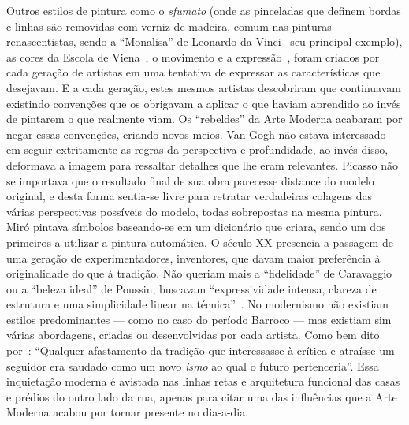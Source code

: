 Outros estilos de pintura como o \textit{sfumato} (onde as pinceladas
que definem bordas e linhas são removidas com verniz de madeira, comum
nas pinturas renascentistas, sendo a ``Monalisa'' de Leonardo da
Vinci~\cite{pegus, hall} seu principal exemplo), as cores da Escola de
Viena~\cite{gardner}, o movimento e a expressão~\cite{gombrich,
  gordon}, foram criados por cada geração de artistas em uma tentativa
de expressar as características que desejavam. E a cada geração, estes
mesmos artistas descobriram que continuavam existindo convenções que
os obrigavam a aplicar o que haviam aprendido ao invés de pintarem o
que realmente viam. Os ``rebeldes'' da Arte Moderna acabaram por negar
essas convenções, criando novos meios. Van Gogh não estava interessado
em seguir extritamente as regras da perspectiva e profundidade, ao
invés disso, deformava a imagem para ressaltar detalhes que lhe eram
relevantes. Picasso não se importava que o resultado final de sua obra
parecesse distance do modelo original, e desta forma sentia-se livre
para retratar verdadeiras colagens das várias perspectivas possíveis
do modelo, todas sobrepostas na mesma pintura. Miró pintava símbolos
baseando-se em um dicionário que criara, sendo um dos primeiros a
utilizar a pintura automática. O século XX presencia a passagem de uma
geração de experimentadores, inventores, que davam maior preferência à
originalidade do que à tradição. Não queriam mais a ``fidelidade'' de
Caravaggio ou a ``beleza ideal'' de Poussin, buscavam ``expressividade
intensa, clareza de estrutura e uma simplicidade linear na
técnica''~\cite{gombrich}. No modernismo não existiam estilos
predominantes --- como no caso do período Barroco --- mas existiam sim
várias abordagens, criadas ou desenvolvidas por cada artista. Como bem
dito por~\citeauthor{gombrich}: ``Qualquer afastamento da tradição que
interessasse à crítica e atraísse um seguidor era saudado como um novo
\emph{ismo} ao qual o futuro pertenceria''. Essa inquietação moderna é
avistada nas linhas retas e arquitetura funcional das casas e prédios
do outro lado da rua, apenas para citar uma das influências que a Arte
Moderna acabou por tornar presente no dia-a-dia.

